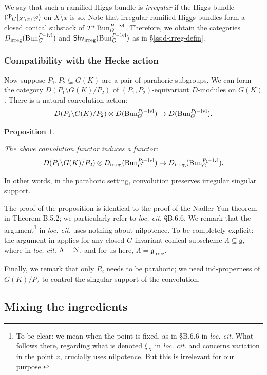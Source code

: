 \documentclass[reqno,11pt]{amsart}
\numberwithin{equation}{subsection}
\newtheorem{prop}[thm]{Proposition}
\theoremstyle{remark}
\newcommand{\sN}{{\EuScript N}}
\newcommand{\sP}{{\EuScript P}}
\newcommand{\fg}{{\mathfrak g}}
\newcommand{\on}{\operatorname}
\newcommand{\mathendash}{\text{\textendash}}
\newcommand{\vph}{\varphi}
\newcommand{\Bun}{\on{Bun}}
\renewcommand{\subset}{\subseteq}
\newcommand{\Shv}{\mathsf{Shv}}
\newcommand{\irreg}{\on{irreg}}
\newcommand{\level}{\mathendash\on{lvl}}
\begin{document}
We say that such a ramified Higgs bundle is \emph{irregular} if the Higgs bundle 
$(\sP_G|_{X\setminus x},\vph)$ on $X\setminus x$ is so. Note that
irregular ramified Higgs bundles form a closed conical
substack of $T^*\Bun_G^{P\level}$.
Therefore, we obtain the categories $D_{\irreg}(\Bun_G^{P\level})$
and $\Shv_{\irreg}(\Bun_G^{P\level})$ as in \S \ref{ss:d-irreg-defin}.

\subsubsection{Compatibility with the Hecke action}\label{sss:hecke-irreg}

Now suppose $P_1,P_2 \subset G(K)$ are a pair of parahoric subgroups.
We can form the category $D(P_1\setminus G(K)/P_2)$ of
$(P_1,P_2)$-equivariant $D$-modules on $G(K)$. 
There is a natural convolution action:
%
\[
D(P_1 \backslash G(K)/P_2) \otimes D(\Bun_G^{P_2\level}) \to 
D(\Bun_G^{P_1\level}).
\]

\begin{prop}\label{p:parahoric-irreg}

The above convolution functor induces a functor:
%
\[
D(P_1 \backslash G(K)/P_2) \otimes D_{\irreg}(\Bun_G^{P_2\level}) \to 
D_{\irreg}(\Bun_G^{P_1\level}).
\]

\end{prop}

In other words, in the parahoric setting, convolution preserves
irregular singular support.

The proof of the proposition is identical to the proof of
the Nadler-Yun theorem in \cite{toy-model} Theorem B.5.2;
we particularly refer to \emph{loc. cit}. \S B.6.6. We remark
that the argument\footnote{To be clear: we mean when the point is
fixed, as in \S B.6.6 in \emph{loc. cit}. What follows there, regarding what
is denoted $\xi_X$ in \emph{loc. cit}. and concerns variation in the point $x$, 
crucially uses nilpotence. But this is irrelevant for our purpose.}
in \emph{loc. cit}. uses nothing about nilpotence. To be completely
explicit: the argument in \cite{toy-model} applies
for any closed $G$-invariant conical subscheme $\Lambda \subset \fg$, where in 
\emph{loc. cit}. $\Lambda = \sN$, and for us here, $\Lambda = \fg_{\irreg}$.

Finally, we remark that only $P_2$ needs to be parahoric; we need
ind-properness of $G(K)/P_2$ to control the singular support of the convolution.

\subsection{Mixing the ingredients}
\end{document}
